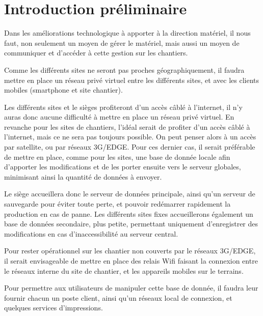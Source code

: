 \section{Introduction préliminaire}

    Dans les améliorations technologique à apporter à la direction matériel, il nous faut, non seulement un moyen de gérer le matériel, mais aussi un moyen de communiquer et d'accéder à cette gestion sur les chantiers.

    Comme les différents sites ne seront pas proches géographiquement, il faudra mettre en place un réseau privé virtuel entre les différents sites, et avec les clients mobiles (smartphone et site chantier).

    Les différents sites et le sièges profiteront d'un accès câblé à l'internet, il n'y auras donc aucune difficulté à mettre en place un réseau privé virtuel.
    En revanche pour les sites de chantiers, l'idéal serait de profiter d'un accès câblé à l'internet, mais ce ne sera pas toujours possible.
    On peut penser alors à un accès par satellite, ou par réseaux 3G/EDGE.
    Pour ces dernier cas, il serait préférable de mettre en place, comme pour les sites, une base de donnée locale afin d'apporter les modifications et de les porter ensuite vers le serveur globales, minimisant ainsi la quantité de données à envoyer.

    Le siège accueillera donc le serveur de données principale, ainsi qu'un serveur de sauvegarde pour éviter toute perte, et pouvoir redémarrer rapidement la production en cas de panne.
    Les différents sites fixes accueillerons également un base de données secondaire, plus petite, permettant uniquement d'enregistrer des modifications en cas d'inaccessibilité au serveur central.

    Pour rester opérationnel sur les chantier non couverts par le réseaux 3G/EDGE, il serait envisageable de mettre en place des relais Wifi faisant la connexion entre le réseaux interne du site de chantier, et les appareils mobiles sur le terrains.

    Pour permettre aux utilisateurs de manipuler cette base de donnée, il faudra leur fournir chacun un poste client, ainsi qu'un réseaux local de connexion, et quelques services d'impressions.


